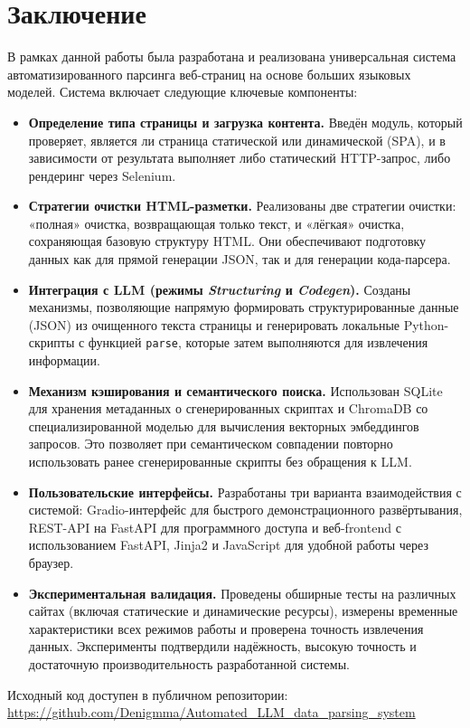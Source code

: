 
\section{Заключение}

В рамках данной работы была разработана и реализована универсальная система автоматизированного парсинга веб-страниц на основе больших языковых моделей. Система включает следующие ключевые компоненты:

\begin{itemize}
    \item \textbf{Определение типа страницы и загрузка контента.} Введён модуль, который проверяет, является ли страница статической или динамической (SPA), и в зависимости от результата выполняет либо статический HTTP-запрос, либо рендеринг через Selenium.
    \item \textbf{Стратегии очистки HTML-разметки.} Реализованы две стратегии очистки: «полная» очистка, возвращающая только текст, и «лёгкая» очистка, сохраняющая базовую структуру HTML. Они обеспечивают подготовку данных как для прямой генерации JSON, так и для генерации кода-парсера.
    \item \textbf{Интеграция с LLM (режимы \emph{Structuring} и \emph{Codegen}).} Созданы механизмы, позволяющие напрямую формировать структурированные данные (JSON) из очищенного текста страницы и генерировать локальные Python-скрипты с функцией \texttt{parse}, которые затем выполняются для извлечения информации.
    \item \textbf{Механизм кэширования и семантического поиска.} Использован SQLite для хранения метаданных о сгенерированных скриптах и ChromaDB со специализированной моделью для вычисления векторных эмбеддингов запросов. Это позволяет при семантическом совпадении повторно использовать ранее сгенерированные скрипты без обращения к LLM.
    \item \textbf{Пользовательские интерфейсы.} Разработаны три варианта взаимодействия с системой: Gradio-интерфейс для быстрого демонстрационного развёртывания, REST-API на FastAPI для программного доступа и веб-frontend с использованием FastAPI, Jinja2 и JavaScript для удобной работы через браузер.
    \item \textbf{Экспериментальная валидация.} Проведены обширные тесты на различных сайтах (включая статические и динамические ресурсы), измерены временные характеристики всех режимов работы и проверена точность извлечения данных. Эксперименты подтвердили надёжность, высокую точность и достаточную производительность разработанной системы.
\end{itemize}

Исходный код доступен в публичном репозитории: \href{https://github.com/Denigmma/Automated_LLM_data_parsing_system}{https://github.com/Denigmma/Automated\_LLM\_data\_parsing\_system}
